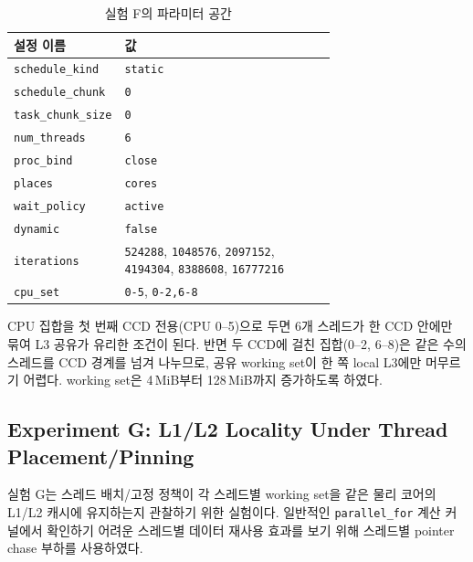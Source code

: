 \documentclass[11pt,a4paper]{article}
\begin{document}
\begin{table}[h]
\centering
\begin{tabular}{lp{0.70\linewidth}}
\toprule
설정 이름 & 값 \\
\midrule
\texttt{schedule\_kind} & \texttt{static} \\
\texttt{schedule\_chunk} & \texttt{0} \\
\texttt{task\_chunk\_size} & \texttt{0} \\
\texttt{num\_threads} & \texttt{6} \\
\texttt{proc\_bind} & \texttt{close} \\
\texttt{places} & \texttt{cores} \\
\texttt{wait\_policy} & \texttt{active} \\
\texttt{dynamic} & \texttt{false} \\
\texttt{iterations} & \texttt{524288}, \texttt{1048576}, \texttt{2097152}, \texttt{4194304}, \texttt{8388608}, \texttt{16777216} \\
\texttt{cpu\_set} & \texttt{0-5}, \texttt{0-2,6-8} \\
\bottomrule
\end{tabular}
\caption{실험 F의 파라미터 공간}
\label{tab:expF-space}
\end{table}

CPU 집합을 첫 번째 CCD 전용(CPU 0--5)으로 두면 6개 스레드가 한 CCD 안에만 묶여 L3 공유가 유리한 조건이 된다. 반면 두 CCD에 걸친 집합(0--2, 6--8)은 같은 수의 스레드를 CCD 경계를 넘겨 나누므로, 공유 working set이 한 쪽 local L3에만 머무르기 어렵다. working set은 4\,MiB부터 128\,MiB까지 증가하도록 하였다.

\subsection{Experiment G: L1/L2 Locality Under Thread Placement/Pinning}

실험 G는 스레드 배치/고정 정책이 각 스레드별 working set을 같은 물리 코어의 L1/L2 캐시에 유지하는지 관찰하기 위한 실험이다. 일반적인 \texttt{parallel\_for} 계산 커널에서 확인하기 어려운 스레드별 데이터 재사용 효과를 보기 위해 스레드별 pointer chase 부하를 사용하였다.
\end{document}
